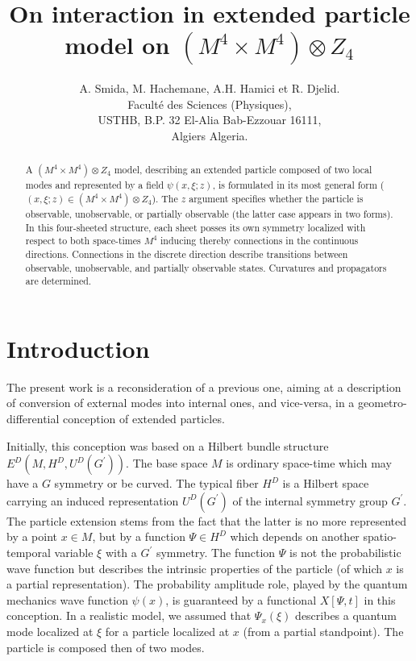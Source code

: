 \documentclass[12pt,a4paper]{article}
\begin{document}
\title{On interaction in extended particle model on $\left(  M^{4}\times
M^{4}\right)  \otimes Z_{4}$}
\author{A. Smida, M. Hachemane, A.H. Hamici et R. Djelid.\\Facult\'{e} des Sciences (Physiques),\\USTHB, B.P. 32 El-Alia Bab-Ezzouar 16111,\\Algiers Algeria.}
\maketitle
\begin{abstract}
A $\left(  M^{4}\times M^{4}\right)  \otimes Z_{4}$ model, describing an
extended particle composed of two local modes and represented by a field
$\psi\left(  x,\xi;z\right)  $, is formulated in its most general form
($\left(  x,\xi;z\right)  \in\left(  M^{4}\times M^{4}\right)  \otimes Z_{4}%
$). The $z$ argument specifies whether the particle is observable,
unobservable, or partially observable (the latter case appears in two forms).
In this four-sheeted structure, each sheet posses its own symmetry localized
with respect to both space-times $M^{4}$ inducing thereby connections in the
continuous directions. Connections in the discrete direction describe
transitions between observable, unobservable, and partially observable states.
Curvatures and propagators are determined.
\end{abstract}



\section{Introduction}

The present work is a reconsideration of a previous one,\cite{Smida 2000}
aiming at a description of conversion of external modes into internal ones,
and vice-versa, in a geometro-differential conception of extended particles.

Initially,\cite{Smida 1995} this conception was based on a Hilbert bundle
structure $E^{D}(M,H^{D},U^{D}(G^{\prime}))$. The base space $M$ is ordinary
space-time which may have a $G$ symmetry or be curved. The typical fiber
$H^{D}$ is a Hilbert space carrying an induced representation\cite{Mensky
1976} $U^{D}\left(  G^{\prime}\right)  $ of the internal symmetry group
$G^{\prime}$. The particle extension stems from the fact that the latter is no
more represented by a point $x\in M$, but by a function $\Psi\in H^{D}$ which
depends on another spatio-temporal variable $\xi$ with a $G^{\prime}$
symmetry. The function $\Psi$ is not the probabilistic wave function but
describes the intrinsic properties of the particle (of which $x$ is a partial
representation).\cite{Destouches 1956} The probability amplitude role, played
by the quantum mechanics wave function $\psi\left(  x\right)  $, is guaranteed
by a functional\cite{Destouches 1956} $X[\Psi,t]$ in this conception. In a
realistic model, we assumed that $\Psi_{x}\left(  \xi\right)  $ describes a
quantum mode localized at $\xi$ for a particle localized at $x$ (from a
partial standpoint). The particle is composed then of two modes.\cite{Smida 1995}
\end{document}
